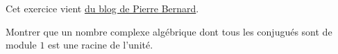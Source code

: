 
\begin{exercice}\label{exoreserve0004}

    Cet exercice vient \href{http://allken-bernard.org/pierre/weblog/?p=2061}{du blog de Pierre Bernard}.

    Montrer que un nombre complexe algébrique dont tous les conjugués sont de module \( 1\) est une racine de l'unité.

\end{exercice}
